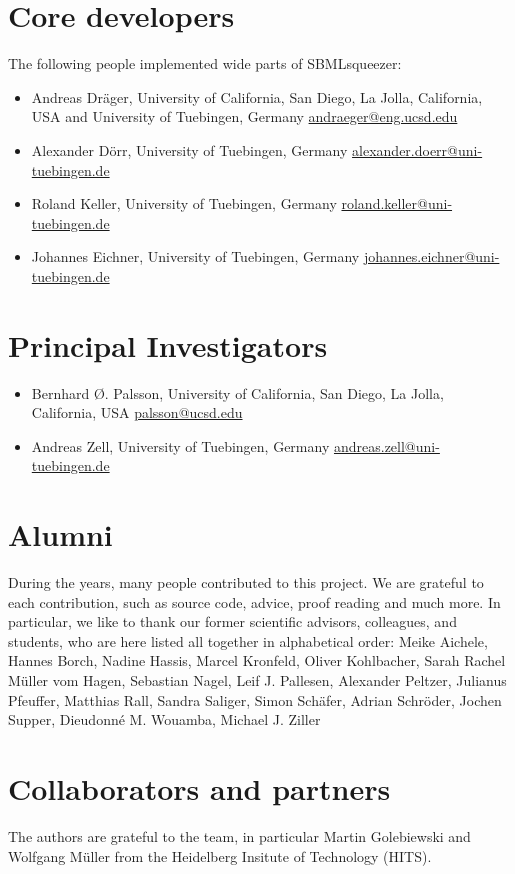 \section{Core developers}

The following people implemented wide parts of SBMLsqueezer:
\begin{itemize}
\item Andreas Dr\"ager, 
  University of California, San Diego, La Jolla, California, USA and
  University of Tuebingen, Germany
  \href{mailto:andraeger@eng.ucsd.edu}{andraeger@eng.ucsd.edu}
\item Alexander D\"orr, 
  University of Tuebingen, Germany
  \href{mailto:alexander.doerr@uni-tuebingen.de}{alexander.doerr@uni-tuebingen.de}
\item Roland Keller,
  University of Tuebingen, Germany
  \href{mailto:roland.keller@uni-tuebingen.de}{roland.keller@uni-tuebingen.de}
\item Johannes Eichner,
  University of Tuebingen, Germany
  \href{mailto:johannes.eichner@uni-tuebingen.de}{johannes.eichner@uni-tuebingen.de}
\end{itemize}

\section{Principal Investigators}

\begin{itemize}
\item Bernhard \O. Palsson,
  University of California, San Diego, La Jolla, California, USA
  \href{mailto:palsson@ucsd.edu}{palsson@ucsd.edu}
\item Andreas Zell, 
  University of Tuebingen, Germany
  \href{mailto:andreas.zell@uni-tuebingen.de}{andreas.zell@uni-tuebingen.de}
\end{itemize}

\section{Alumni}

During the years, many people contributed to this project.
We are grateful to each contribution, such as source code, advice, proof reading
and much more. In particular, we like to thank our former scientific advisors,
colleagues, and students, who are here listed all together in alphabetical
order:
Meike Aichele,
Hannes Borch,
Nadine Hassis,
Marcel Kronfeld,
Oliver Kohlbacher,
Sarah Rachel M\"uller vom Hagen,
Sebastian Nagel,
Leif J. Pallesen,
Alexander Peltzer,
Julianus Pfeuffer,
Matthias Rall,
Sandra Saliger,
Simon Sch\"afer,
Adrian Schr\"oder,
Jochen Supper,
Dieudonn\'e M. Wouamba,
Michael J. Ziller

\section{Collaborators and partners}

The authors are grateful to the \SABIO team, in particular Martin Golebiewski and Wolfgang M\"uller from the Heidelberg Insitute of Technology (HITS).
